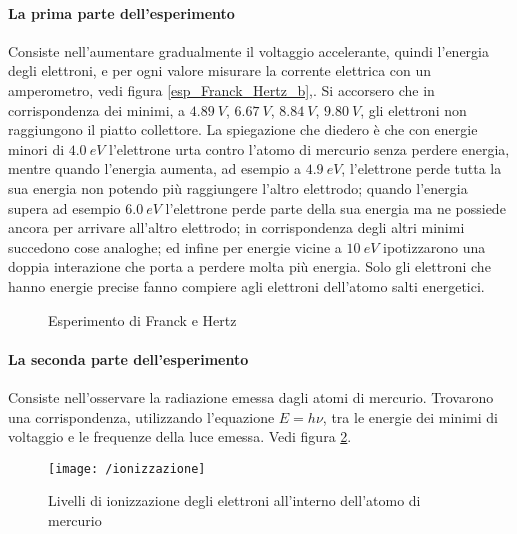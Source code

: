 \paragraph{La prima parte dell'esperimento}
Consiste nell'aumentare gradualmente il voltaggio accelerante, quindi l'energia degli elettroni, e per ogni valore misurare la corrente elettrica con un amperometro, vedi figura \ref{esp_Franck_Hertz_b},.
Si accorsero che in corrispondenza dei minimi, a $\SI{4.89}{V}$, $\SI{6.67}{V}$, $\SI{8.84}{V}$, $\SI{9.80}{V}$, gli elettroni non raggiungono il piatto collettore.
La spiegazione che diedero è che con energie minori di $\SI{4.0}{eV}$ l'elettrone urta contro l'atomo di mercurio senza perdere energia, mentre quando l'energia aumenta, ad esempio a $\SI{4.9}{eV}$, l'elettrone perde tutta la sua energia non potendo più raggiungere l'altro elettrodo; quando l'energia supera ad esempio $\SI{6.0}{eV}$ l'elettrone perde parte della sua energia ma ne possiede ancora per arrivare all'altro elettrodo; in corrispondenza degli altri minimi succedono cose analoghe; ed infine per energie vicine a $\SI{10}{eV}$ ipotizzarono una doppia interazione che porta a perdere molta più energia.
Solo gli elettroni che hanno energie precise fanno compiere agli elettroni dell'atomo salti energetici.
\begin{figure}[h]
    \centering
    \caption{Esperimento di Franck e Hertz}
    \label{esp_Franck_Hertz_overall}
\end{figure}

\paragraph{La seconda parte dell'esperimento} 
Consiste nell'osservare la radiazione emessa dagli atomi di mercurio.
Trovarono una corrispondenza, utilizzando l'equazione $E=h\nu$, tra le energie dei minimi di voltaggio e le frequenze della luce emessa.
Vedi figura \ref{emissione_Hg}.
\begin{figure}[h]
\centering
\texttt{[image: /ionizzazione]}
\caption{Livelli di ionizzazione degli elettroni all'interno dell'atomo di mercurio}
\label{emissione_Hg}
\end{figure}


